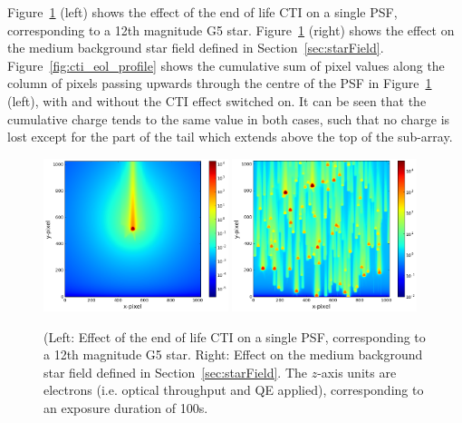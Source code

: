\documentclass[11pt]{article}      %
\begin{document}
Figure~\ref{fig:cti_eol} (left) shows the effect of the end of life CTI on a single PSF, corresponding to a 12th magnitude G5 star. Figure~\ref{fig:cti_eol} (right) shows the effect on the medium background star field defined in Section~\ref{sec:starField}. Figure~\ref{fig:cti_eol_profile} shows the cumulative sum of pixel values along the column of pixels passing upwards through the centre of the PSF in Figure~\ref{fig:cti_eol} (left), with and without the CTI effect switched on. It can be seen that the cumulative charge tends to the same value in both cases, such that no charge is lost except for the part of the tail which extends above the top of the sub-array.

\begin{figure}[htbp]
  \begin{center}
    \includegraphics[width=0.48\textwidth]{cti_eol_onestar.png}
    \includegraphics[width=0.48\textwidth]{cti_eol_starField.png}
    \caption{(Left: Effect of the end of life CTI on a single PSF, corresponding to a 12th magnitude G5 star. Right: Effect on the medium background star field defined in Section~\ref{sec:starField}. The $z$-axis units are electrons (i.e. optical throughput and QE applied), corresponding to an exposure duration of 100s.}
    \label{fig:cti_eol}
  \end{center}
\end{figure}
\end{document}
